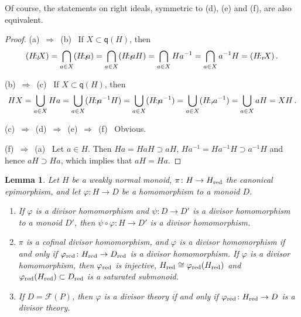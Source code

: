 \documentclass[a4paper]{amsart}
\newtheorem{lemma}[theorem]{Lemma}
\theoremstyle{definition}
\numberwithin{equation}{section}
\begin{document}
\smallskip
{} Of course, the  statements on right ideals,
symmetric to (d), (e) and (f), are also equivalent.

\begin{proof}
(a) \,$\Rightarrow$\, (b) \ If $X \subset \mathsf q (H)$, then
\[
(H {\negthinspace :_l \negthinspace} X) = \bigcap_{a \in X} (H {\negthinspace :_l \negthinspace} a) = \bigcap_{a \in X} (H
{\negthinspace :_l \negthinspace} aH) = \bigcap_{a \in X} Ha^{-1} = \bigcap_{a \in X} a^{-1}H =
(H {\negthinspace :_r \negthinspace} X) \,.
\]

\smallskip
(b) \,$\Rightarrow$\, (c) \ If $X \subset \mathsf q (H)$, then
\[
HX = \bigcup_{a \in X} Ha = \bigcup_{a \in X} (H {\negthinspace :_l \negthinspace} a^{-1}H) =
\bigcup_{a \in X} (H {\negthinspace :_l \negthinspace} a^{-1}) = \bigcup_{a \in X} (H {\negthinspace :_r \negthinspace}
a^{-1})  = \bigcup_{a \in X} aH = XH \,.
\]

\smallskip
(c) \,$\Rightarrow$\, (d) \,$\Rightarrow$\, (e) \,$\Rightarrow$\,
(f) \ Obvious.

\smallskip
(f) \,$\Rightarrow$\, (a) \ Let $a \in H$. Then $Ha = HaH \supset
aH$, $Ha^{-1} = Ha^{-1}H \supset a^{-1}H$ and hence $aH \supset Ha$,
which implies that $aH = Ha$.
\end{proof}

\medskip
\begin{lemma} \label{4.6}
Let $H$ be a weakly normal monoid, $\pi \colon H \to H_{{\text{\rm red}}}$ the
canonical epimorphism, and let $\varphi \colon H \to D$ be a
homomorphism to a monoid $D$.
\begin{enumerate}
\item If $\varphi$ is a divisor homomorphism and $\psi \colon D \to D'$ is a divisor homomorphism to a  monoid $D'$,
      then $\psi \circ \varphi \colon H \to D'$ is a divisor homomorphism.

\smallskip
\item $\pi$ is a cofinal divisor homomorphism, and $\varphi$ is a divisor homomorphism if and only if $\varphi_{{\text{\rm red}}} \colon H_{{\text{\rm red}}} \to D_{{\text{\rm red}}}$ is a divisor
      homomorphism. If $\varphi$ is a divisor homomorphism, then
      $\varphi_{{\text{\rm red}}}$ is injective, $H_{{\text{\rm red}}} \cong \varphi_{{\text{\rm red}}}
      (H_{{\text{\rm red}}})$ and $\varphi_{{\text{\rm red}}} (H_{{\text{\rm red}}}) \subset D_{{\text{\rm red}}}$ is a
      saturated submonoid.

\smallskip
\item If $D = \mathcal F (P)$, then $\varphi$ is a divisor theory if and only if $\varphi_{{\text{\rm red}}} \colon H_{{\text{\rm red}}} \to D$ is a divisor theory.
\end{enumerate}
\end{lemma}
\end{document}
